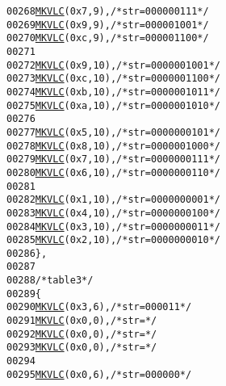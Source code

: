 \begin{footnotesize}
\begin{alltt}
00268         \hyperlink{vlc_8h_aa680b26539d09b5954221ff39a127faa}{MKVLC}( 0x7, 9 ), \textcolor{comment}{/* str=000000111 */}
00269         \hyperlink{vlc_8h_aa680b26539d09b5954221ff39a127faa}{MKVLC}( 0x9, 9 ), \textcolor{comment}{/* str=000001001 */}
00270         \hyperlink{vlc_8h_aa680b26539d09b5954221ff39a127faa}{MKVLC}( 0xc, 9 ), \textcolor{comment}{/* str=000001100 */}
00271 
00272         \hyperlink{vlc_8h_aa680b26539d09b5954221ff39a127faa}{MKVLC}( 0x9, 10 ), \textcolor{comment}{/* str=0000001001 */}
00273         \hyperlink{vlc_8h_aa680b26539d09b5954221ff39a127faa}{MKVLC}( 0xc, 10 ), \textcolor{comment}{/* str=0000001100 */}
00274         \hyperlink{vlc_8h_aa680b26539d09b5954221ff39a127faa}{MKVLC}( 0xb, 10 ), \textcolor{comment}{/* str=0000001011 */}
00275         \hyperlink{vlc_8h_aa680b26539d09b5954221ff39a127faa}{MKVLC}( 0xa, 10 ), \textcolor{comment}{/* str=0000001010 */}
00276 
00277         \hyperlink{vlc_8h_aa680b26539d09b5954221ff39a127faa}{MKVLC}( 0x5, 10 ), \textcolor{comment}{/* str=0000000101 */}
00278         \hyperlink{vlc_8h_aa680b26539d09b5954221ff39a127faa}{MKVLC}( 0x8, 10 ), \textcolor{comment}{/* str=0000001000 */}
00279         \hyperlink{vlc_8h_aa680b26539d09b5954221ff39a127faa}{MKVLC}( 0x7, 10 ), \textcolor{comment}{/* str=0000000111 */}
00280         \hyperlink{vlc_8h_aa680b26539d09b5954221ff39a127faa}{MKVLC}( 0x6, 10 ), \textcolor{comment}{/* str=0000000110 */}
00281 
00282         \hyperlink{vlc_8h_aa680b26539d09b5954221ff39a127faa}{MKVLC}( 0x1, 10 ), \textcolor{comment}{/* str=0000000001 */}
00283         \hyperlink{vlc_8h_aa680b26539d09b5954221ff39a127faa}{MKVLC}( 0x4, 10 ), \textcolor{comment}{/* str=0000000100 */}
00284         \hyperlink{vlc_8h_aa680b26539d09b5954221ff39a127faa}{MKVLC}( 0x3, 10 ), \textcolor{comment}{/* str=0000000011 */}
00285         \hyperlink{vlc_8h_aa680b26539d09b5954221ff39a127faa}{MKVLC}( 0x2, 10 ), \textcolor{comment}{/* str=0000000010 */}
00286     \},
00287 
00288     \textcolor{comment}{/* table 3 */}
00289     \{
00290         \hyperlink{vlc_8h_aa680b26539d09b5954221ff39a127faa}{MKVLC}( 0x3, 6 ), \textcolor{comment}{/* str=000011 */}
00291         \hyperlink{vlc_8h_aa680b26539d09b5954221ff39a127faa}{MKVLC}( 0x0, 0 ), \textcolor{comment}{/* str= */}
00292         \hyperlink{vlc_8h_aa680b26539d09b5954221ff39a127faa}{MKVLC}( 0x0, 0 ), \textcolor{comment}{/* str= */}
00293         \hyperlink{vlc_8h_aa680b26539d09b5954221ff39a127faa}{MKVLC}( 0x0, 0 ), \textcolor{comment}{/* str= */}
00294 
00295         \hyperlink{vlc_8h_aa680b26539d09b5954221ff39a127faa}{MKVLC}( 0x0, 6 ), \textcolor{comment}{/* str=000000 */}

\end{alltt}
\end{footnotesize}
